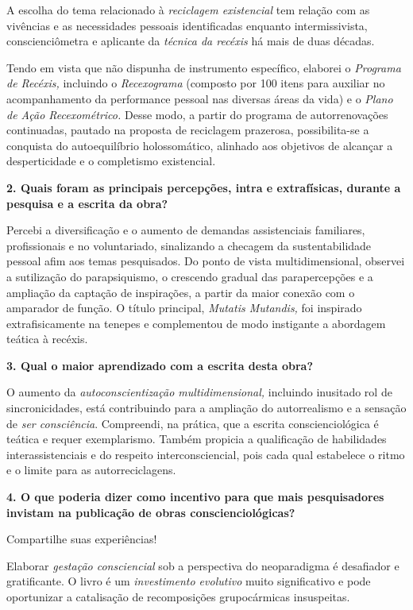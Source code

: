 \documentclass{gescons}
\begin{document}
\begin{multicols}{2}
A escolha do tema relacionado à \emph{reciclagem existencial} tem relação com as vivências e as necessidades pessoais identificadas enquanto intermissivista, conscienciômetra e aplicante da \emph{técnica da recéxis} há mais de duas décadas.

Tendo em vista que não dispunha de instrumento específico, elaborei o \emph{Programa de Recéxis,} incluindo o \emph{Recexograma} (composto por 100 itens para auxiliar no acompanhamento da performance pessoal nas diversas áreas da vida) e o \emph{Plano de Ação Recexométrico.} Desse modo, a partir do programa de autorrenovações continuadas, pautado na proposta de reciclagem prazerosa, possibilita-se a conquista do autoequilíbrio holossomático, alinhado aos objetivos de alcançar a desperticidade e o completismo existencial.

\textbf{2. Quais foram as principais percepções, intra e extrafísicas, durante a pesquisa e a escrita da obra?}

Percebi a diversificação e o aumento de demandas assistenciais familiares, profissionais e no voluntariado, sinalizando a checagem da sustentabilidade pessoal afim aos temas pesquisados. Do ponto de vista multidimensional, observei a sutilização do parapsiquismo, o crescendo gradual das parapercepções e a ampliação da captação de inspirações, a partir da maior conexão com o amparador de função. O título principal, \emph{Mutatis Mutandis,} foi inspirado extrafisicamente na tenepes e complementou de modo instigante a abordagem teática à recéxis.

\textbf{3. Qual o maior aprendizado com a escrita desta obra?}

O aumento da \emph{autoconscientização multidimensional,} incluindo inusitado rol de sincronicidades, está contribuindo para a ampliação do autorrealismo e a sensação de \emph{ser consciência}. Compreendi, na prática, que a escrita conscienciológica é teática e requer exemplarismo. Também propicia a qualificação de habilidades interassistenciais e do respeito interconsciencial, pois cada qual estabelece o ritmo e o limite para as autorreciclagens.

\textbf{4. O que poderia dizer como incentivo para que mais pesquisadores invistam na publicação de obras conscienciológicas?}

Compartilhe suas experiências!

Elaborar \emph{gestação consciencial} sob a perspectiva do neoparadigma é desafiador e gratificante. O livro é um \emph{investimento evolutivo} muito significativo e pode oportunizar a catalisação de recomposições grupocármicas insuspeitas.

% 
    
    \end{multicols}
\end{document}
